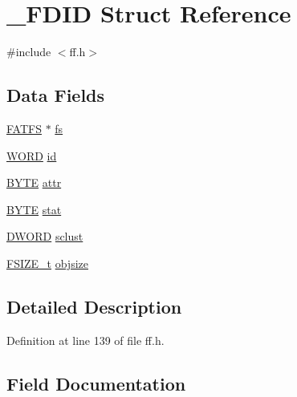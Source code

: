 \hypertarget{struct__FDID}{}\section{\+\_\+\+F\+D\+ID Struct Reference}
\label{struct__FDID}


{\ttfamily \#include $<$ff.\+h$>$}

\subsection*{Data Fields}
\begin{DoxyCompactItemize}
\item 
\hyperlink{structFATFS}{F\+A\+T\+FS} $\ast$ \hyperlink{struct__FDID_aefa4597d88e54bace32e6c15e11d9610}{fs}
\item 
\hyperlink{integer_8h_a197942eefa7db30960ae396d68339b97}{W\+O\+RD} \hyperlink{struct__FDID_a363d7bdab408418b911ac1502bc22ea6}{id}
\item 
\hyperlink{lz4_8c_a4ae1dab0fb4b072a66584546209e7d58}{B\+Y\+TE} \hyperlink{struct__FDID_a6912cfc1ea914d7b68a18b846065d790}{attr}
\item 
\hyperlink{lz4_8c_a4ae1dab0fb4b072a66584546209e7d58}{B\+Y\+TE} \hyperlink{struct__FDID_a1a2ff09f2ef172772f4e7312070be708}{stat}
\item 
\hyperlink{integer_8h_ad342ac907eb044443153a22f964bf0af}{D\+W\+O\+RD} \hyperlink{struct__FDID_ae2fbaaa31b5d12b333cb6d1ded099412}{sclust}
\item 
\hyperlink{ff_8h_a3fc0992ad7436250b6b1a0592214b7f2}{F\+S\+I\+Z\+E\+\_\+t} \hyperlink{struct__FDID_a27039b8d89a4a62efabab36e6b303819}{objsize}
\end{DoxyCompactItemize}


\subsection{Detailed Description}


Definition at line 139 of file ff.\+h.



\subsection{Field Documentation}
\mbox{\label{struct__FDID_a6912cfc1ea914d7b68a18b846065d790}} 
